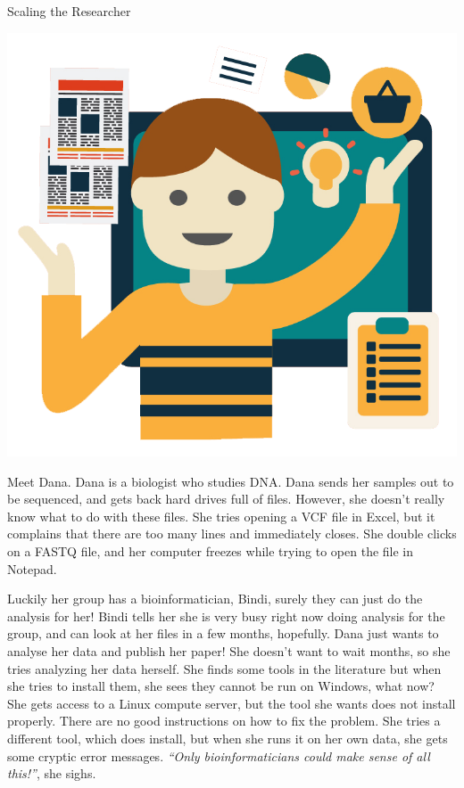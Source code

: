 \begin{center}
\vspace*{-0.5cm}
{\Large Scaling the Researcher \normalsize
\small

\vspace*{0.3cm}
\includegraphics[scale=0.1]{chapters/images/discussion/dana.png}
\vspace*{0.3cm}

Meet Dana.
Dana is a biologist who studies DNA\@.
Dana sends her samples out to be sequenced, and gets back hard drives full of files.
However, she doesn't really know what to do with these files.
She tries opening a VCF file in Excel, but it complains that there are too many lines and immediately closes.
She double clicks on a FASTQ file, and her computer freezes while trying to open the file in Notepad.

Luckily her group has a bioinformatician, Bindi, surely they can just do the analysis for her!
Bindi tells her she is very busy right now doing analysis for the group, and can look at her files in a few months, hopefully.
Dana just wants to analyse her data and publish her paper! She doesn't want to wait months, so she tries analyzing her data herself.
She finds some tools in the literature but when she tries to install them, she sees they cannot be run on Windows, what now?
She gets access to a Linux compute server, but the tool she wants does not install properly.
There are no good instructions on how to fix the problem.
She tries a different tool, which does install, but when she runs it on her own data, she gets some cryptic error messages.
\emph{``Only bioinformaticians could make sense of all this!''}, she sighs.

}
\end{center}
